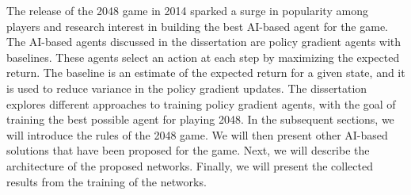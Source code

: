 The release of the 2048 game in 2014 sparked a surge in popularity among players and research interest in building the best AI-based agent for the game.
The AI-based agents discussed in the dissertation are policy gradient agents with baselines. These agents select an action at each step by maximizing the expected return. The baseline is an estimate of the expected return for a given state, and it is used to reduce variance in the policy gradient updates. The dissertation explores different approaches to training policy gradient agents, with the goal of training the best possible agent for playing 2048.
In the subsequent sections, we will introduce the rules of the 2048 game. We will then present other AI-based solutions that have been proposed for the game. Next, we will describe the architecture of the proposed networks. Finally, we will present the collected results from the training of the networks.
